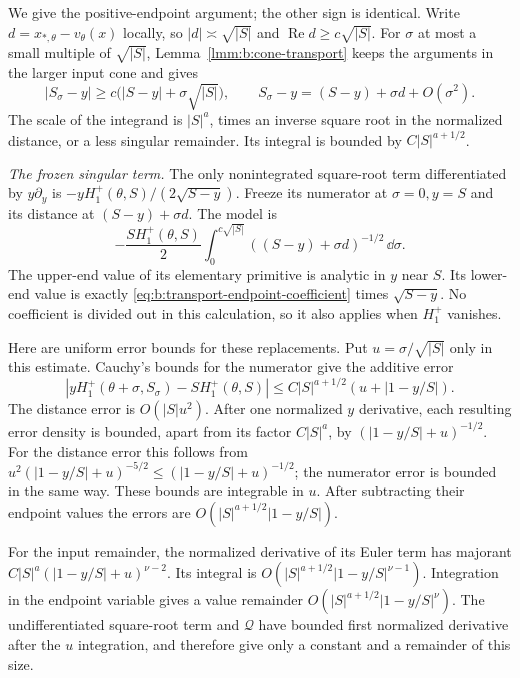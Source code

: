 \begin{prf}
We give the positive-endpoint argument; the other sign is identical.
Write $d=x_{*,\theta}-v_\theta(x)$ locally, so
$|d|\asymp\sqrt{|S|}$ and $\operatorname{Re}d\geq c\sqrt{|S|}$.
For $\sigma$ at most a small multiple of $\sqrt{|S|}$,
Lemma~\ref{lmm:b:cone-transport} keeps the arguments in the larger
input cone and gives
\[
 |S_\sigma-y|\geq c\bigl(|S-y|+\sigma\sqrt{|S|}\bigr),
 \qquad S_\sigma-y=(S-y)+\sigma d+O(\sigma^2).
\]
The scale of the integrand is $|S|^a$, times an inverse square root
in the normalized distance, or a less singular remainder.
Its integral is bounded by $C|S|^{a+1/2}$.

\smallskip\noindent
\emph{The frozen singular term.}
The only nonintegrated square-root term differentiated by
$y\partial_y$ is $-yH_1^+(\theta,S)/(2\sqrt{S-y})$.
Freeze its numerator at $\sigma=0,y=S$ and its distance at
$(S-y)+\sigma d$. The model is
\begin{equation}\label{eq:b:frozen-model}
 -\frac{S H_1^+(\theta,S)}2
       \int_0^{c\sqrt{|S|}}
                  ((S-y)+\sigma d)^{-1/2}\,\dd\sigma.
\end{equation}
The upper-end value of its elementary primitive is analytic in $y$
near $S$. Its lower-end value is exactly
\eqref{eq:b:transport-endpoint-coefficient} times $\sqrt{S-y}$.
No coefficient is divided out in this calculation, so it also applies
when $H_1^+$ vanishes.

Here are uniform error bounds for these replacements. Put
$u=\sigma/\sqrt{|S|}$ only in this estimate. Cauchy's bounds for
the numerator give the additive error
\[
 |yH_1^+(\theta+\sigma,S_\sigma)-S H_1^+(\theta,S)|
       \leq C|S|^{a+1/2}(u+|1-y/S|).
\]
The distance error is $O(|S|u^2)$. After one normalized
$y$ derivative, each resulting error density is bounded, apart
from its factor $C|S|^a$, by
$(|1-y/S|+u)^{-1/2}$.
For the distance error this follows from
$u^2(|1-y/S|+u)^{-5/2}\leq(|1-y/S|+u)^{-1/2}$;
the numerator error is bounded in the same way.
These bounds are integrable in $u$. After subtracting their endpoint
values the errors are $O(|S|^{a+1/2}|1-y/S|)$.

For the input remainder, the normalized derivative of its Euler term
has majorant
$C|S|^a(|1-y/S|+u)^{\nu-2}$.
Its integral is $O(|S|^{a+1/2}|1-y/S|^{\nu-1})$.
Integration in the endpoint variable gives a value remainder
$O(|S|^{a+1/2}|1-y/S|^\nu)$.
The undifferentiated square-root term and $\mathcal Q$ have bounded
first normalized derivative after the $u$ integration, and therefore
give only a constant and a remainder of this size.


\end{prf}
